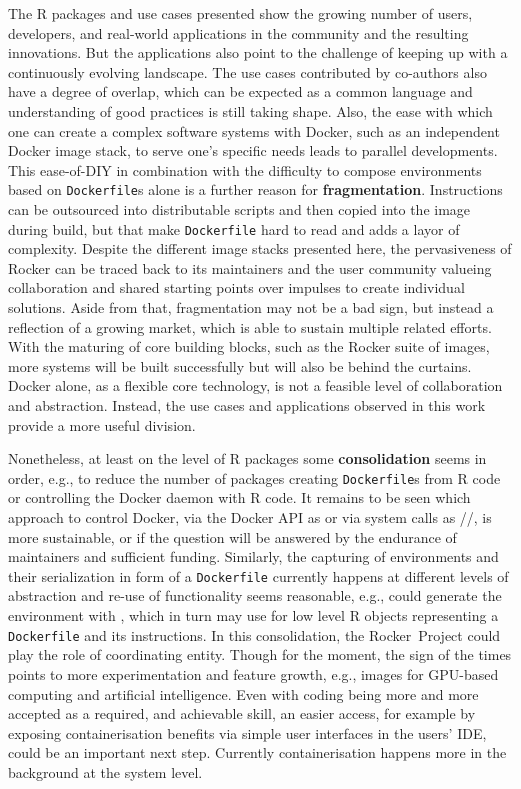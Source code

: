 The R packages and use cases presented show the growing number of users,
developers, and real-world applications in the community and the
resulting innovations. But the applications also point to the challenge
of keeping up with a continuously evolving landscape. The use cases
contributed by co-authors also have a degree of overlap, which can be
expected as a common language and understanding of good practices is
still taking shape. Also, the ease with which one can create a complex
software systems with Docker, such as an independent Docker image stack,
to serve one's specific needs leads to parallel developments. This
ease-of-DIY in combination with the difficulty to compose environments
based on \texttt{Dockerfile}s alone is a further reason for
\textbf{fragmentation}. Instructions can be outsourced into
distributable scripts and then copied into the image during build, but
that make \texttt{Dockerfile} hard to read and adds a layor of
complexity. Despite the different image stacks presented here, the
pervasiveness of Rocker can be traced back to its maintainers and the
user community valueing collaboration and shared starting points over
impulses to create individual solutions. Aside from that, fragmentation
may not be a bad sign, but instead a reflection of a growing market,
which is able to sustain multiple related efforts. With the maturing of
core building blocks, such as the Rocker suite of images, more systems
will be built successfully but will also be behind the curtains. Docker
alone, as a flexible core technology, is not a feasible level of
collaboration and abstraction. Instead, the use cases and applications
observed in this work provide a more useful division.

Nonetheless, at least on the level of R packages some
\textbf{consolidation} seems in order, e.g., to reduce the number of
packages creating \texttt{Dockerfile}s from R code or controlling the
Docker daemon with R code. It remains to be seen which approach to
control Docker, via the Docker API as  or via system
calls as //, is more sustainable,
or if the question will be answered by the endurance of maintainers and
sufficient funding. Similarly, the capturing of environments and their
serialization in form of a \texttt{Dockerfile} currently happens at
different levels of abstraction and re-use of functionality seems
reasonable, e.g.,  could generate the environment with
, which in turn may use  for low level
R objects representing a \texttt{Dockerfile} and its instructions. In
this consolidation, the Rocker~Project could play the role of
coordinating entity. Though for the moment, the sign of the times points
to more experimentation and feature growth, e.g., images for GPU-based
computing and artificial intelligence. Even with coding being more and
more accepted as a required, and achievable skill, an easier access, for
example by exposing containerisation benefits via simple user interfaces
in the users' IDE, could be an important next step. Currently
containerisation happens more in the background at the system level.

